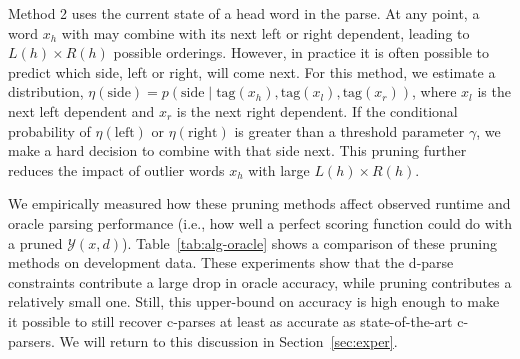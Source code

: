 \documentclass[11pt,letterpaper]{article}
\newcommand{\rules}{\mathcal{R}}
\newcommand{\Rule}[3]{#1 \rightarrow #2\ #3}
\newcommand{\TagFN}[1]{\mathrm{tag}({#1})}
\begin{document}
Method 2 uses the current state of a head word in the parse.  At any
point, a word $x_h$ with may combine with its next left or right
dependent, leading to $L(h)\times R(h)$ possible orderings.  However,
in practice it is often possible to predict which side, left or right,
will come next.  For this method, we estimate a distribution,
$ \eta(\textrm{side}) = p(\textrm{side} \mid \TagFN{x_h}, \TagFN{x_l},
\TagFN{x_r})$, where $x_l$ is the next left dependent and $x_r$ is the
next right dependent. If the conditional probability of
$\eta(\mathrm{left})$ or $\eta(\mathrm{right})$ is greater than a
threshold parameter $\gamma$, we make a hard decision to combine with
that side next. This pruning further reduces the impact of outlier
words $x_h$ with large $L(h) \times R(h)$.


 

We empirically measured how these pruning methods affect observed
runtime and oracle parsing performance (i.e., how well a perfect
scoring function could do with a pruned $\mathcal{Y}(x, d)$).
Table~\ref{tab:alg-oracle} shows a comparison of these pruning
methods on development data.   These
experiments show that the d-parse constraints contribute a large drop
in oracle accuracy, while pruning contributes a relatively small one.
Still, this upper-bound on accuracy is high enough
to make it possible to still recover c-parses at least as accurate as
state-of-the-art c-parsers. We will return 
to this discussion in Section~\ref{sec:exper}.



\end{document}
